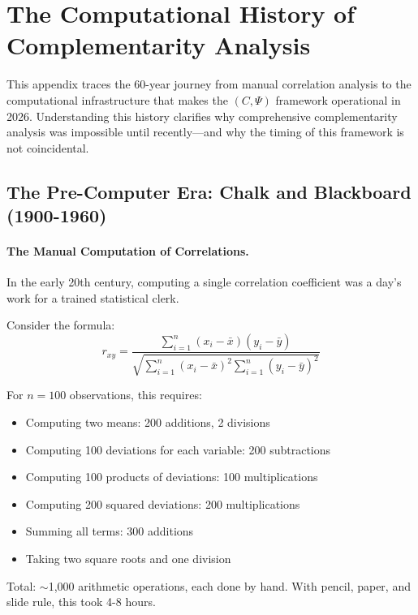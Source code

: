 \documentclass[12pt,a4paper]{article}
\begin{document}
\section{The Computational History of Complementarity Analysis}
\label{app:computationalhistory}

This appendix traces the 60-year journey from manual correlation analysis
to the computational infrastructure that makes the $(C, \Psi)$ framework
operational in 2026. Understanding this history clarifies why comprehensive
complementarity analysis was impossible until recently---and why the timing
of this framework is not coincidental.

\subsection{The Pre-Computer Era: Chalk and Blackboard (1900-1960)}

\paragraph{The Manual Computation of Correlations.}
In the early 20th century, computing a single correlation coefficient
was a day's work for a trained statistical clerk.

Consider the formula:
\begin{equation}
  r_{xy} = \frac{\sum_{i=1}^{n}(x_i - \bar{x})(y_i - \bar{y})}
               {\sqrt{\sum_{i=1}^{n}(x_i - \bar{x})^2 \sum_{i=1}^{n}(y_i - \bar{y})^2}}
\end{equation}

For $n = 100$ observations, this requires:
\begin{itemize}
  \item Computing two means: 200 additions, 2 divisions
  \item Computing 100 deviations for each variable: 200 subtractions
  \item Computing 100 products of deviations: 100 multiplications
  \item Computing 200 squared deviations: 200 multiplications
  \item Summing all terms: 300 additions
  \item Taking two square roots and one division
\end{itemize}

Total: $\sim$1,000 arithmetic operations, each done by hand.
With pencil, paper, and slide rule, this took 4-8 hours.
\end{document}

